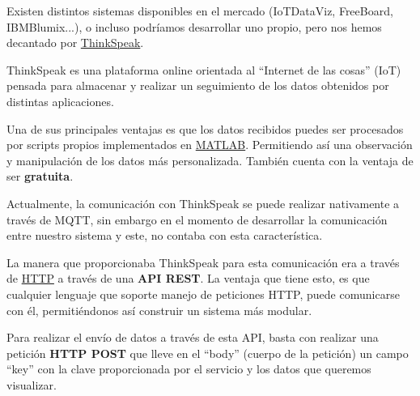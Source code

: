 Existen distintos sistemas disponibles en el mercado (IoTDataViz, FreeBoard, IBMBlumix...), o incluso podríamos desarrollar uno propio, pero nos hemos decantado por \href{https://thingspeak.com/}{ThinkSpeak}.

ThinkSpeak es una plataforma online orientada al ``Internet de las cosas'' (IoT) pensada para almacenar y realizar un seguimiento de los datos obtenidos por distintas aplicaciones.

Una de sus principales ventajas es que los datos recibidos puedes ser procesados por scripts propios implementados en \href{https://es.mathworks.com/products/matlab.html}{MATLAB}. Permitiendo así una observación y manipulación de los datos más personalizada. También cuenta con la ventaja de ser \textbf{gratuita}.

Actualmente, la comunicación con ThinkSpeak se puede realizar nativamente a través de MQTT, sin embargo en el momento de desarrollar la comunicación entre nuestro sistema y este, no contaba con esta característica.

La manera que proporcionaba ThinkSpeak para esta comunicación era a través de \href{https://es.wikipedia.org/wiki/Hypertext_Transfer_Protocol}{HTTP} a través de una \textbf{API REST}. La ventaja que tiene esto, es que cualquier lenguaje que soporte manejo de peticiones HTTP, puede comunicarse con él, permitiéndonos así construir un sistema más modular.

Para realizar el envío de datos a través de esta API, basta con realizar una petición \textbf{HTTP POST} que lleve en el ``body'' (cuerpo de la petición) un campo ``key'' con la clave proporcionada por el servicio y los datos que queremos visualizar. 

